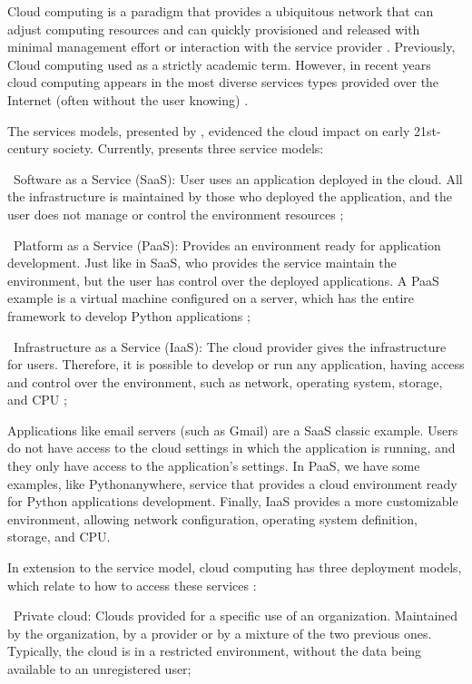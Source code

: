 Cloud computing is a paradigm that provides a ubiquitous network that can adjust computing resources and can quickly provisioned and released with minimal management effort or interaction with the service provider \cite{Mell2011TheComputing}. Previously, Cloud computing used as a strictly academic term. However, in recent years cloud computing appears in the most diverse services types provided over the Internet (often without the user knowing) \cite{Marinescu2013CloudPractice}.

The services models, presented by \cite{Mell2011TheComputing}, evidenced the cloud impact on early 21st-century society. Currently, \cite{Mell2011TheComputing} presents three service models:

\textbullet\ Software as a Service (SaaS): User uses an application deployed in the cloud. All the infrastructure is maintained by those who deployed the application, and the user does not manage or control the environment resources \cite{Mell2011TheComputing};

\textbullet\ Platform as a Service (PaaS): Provides an environment ready for application development. Just like in SaaS, who provides the service maintain the environment, but the user has control over the deployed applications. A PaaS example is a virtual machine configured on a server, which has the entire framework to develop Python applications \cite{Mell2011TheComputing};

\textbullet\ Infrastructure as a Service (IaaS): The cloud provider gives the infrastructure for users. Therefore, it is possible to develop or run any application, having access and control over the environment, such as network, operating system, storage, and CPU \cite{Mell2011TheComputing};

Applications like email servers (such as Gmail) are a SaaS classic example. Users do not have access to the cloud settings in which the application is running, and they only have access to the application's settings. In PaaS, we have some examples, like Pythonanywhere, service that provides a cloud environment ready for Python applications development. Finally, IaaS provides a more customizable environment, allowing network configuration, operating system definition, storage, and CPU. 

In extension to the service model, cloud computing has three deployment models, which relate to how to access these services \cite{Mell2011TheComputing}:

\textbullet\ Private cloud: Clouds provided for a specific use of an organization. Maintained by the organization, by a provider or by a mixture of the two previous ones. Typically, the cloud is in a restricted environment, without the data being available to an unregistered user;

